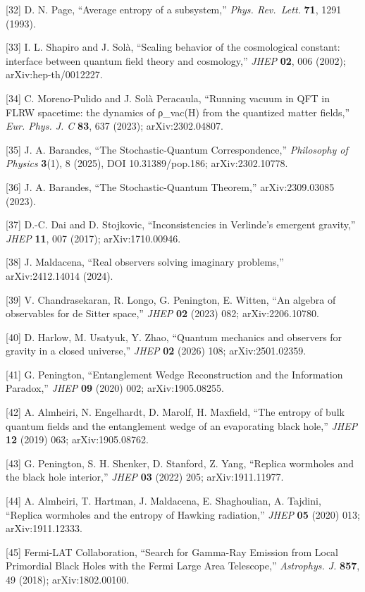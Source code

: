 \documentclass[
]{article}
\begin{document}
{[}32{]} D. N. Page, ``Average entropy of a subsystem,'' \emph{Phys.
Rev.~Lett.} \textbf{71}, 1291 (1993).

{[}33{]} I. L. Shapiro and J. Solà, ``Scaling behavior of the
cosmological constant: interface between quantum field theory and
cosmology,'' \emph{JHEP} \textbf{02}, 006 (2002); arXiv:hep-th/0012227.

{[}34{]} C. Moreno-Pulido and J. Solà Peracaula, ``Running vacuum in QFT
in FLRW spacetime: the dynamics of ρ\_vac(H) from the quantized matter
fields,'' \emph{Eur. Phys. J. C} \textbf{83}, 637 (2023);
arXiv:2302.04807.

{[}35{]} J. A. Barandes, ``The Stochastic-Quantum Correspondence,''
\emph{Philosophy of Physics} \textbf{3}(1), 8 (2025), DOI
10.31389/pop.186; arXiv:2302.10778.

{[}36{]} J. A. Barandes, ``The Stochastic-Quantum Theorem,''
arXiv:2309.03085 (2023).

{[}37{]} D.-C. Dai and D. Stojkovic, ``Inconsistencies in Verlinde's
emergent gravity,'' \emph{JHEP} \textbf{11}, 007 (2017);
arXiv:1710.00946.

{[}38{]} J. Maldacena, ``Real observers solving imaginary problems,''
arXiv:2412.14014 (2024).

{[}39{]} V. Chandrasekaran, R. Longo, G. Penington, E. Witten, ``An
algebra of observables for de Sitter space,'' \emph{JHEP} \textbf{02}
(2023) 082; arXiv:2206.10780.

{[}40{]} D. Harlow, M. Usatyuk, Y. Zhao, ``Quantum mechanics and
observers for gravity in a closed universe,'' \emph{JHEP} \textbf{02}
(2026) 108; arXiv:2501.02359.

{[}41{]} G. Penington, ``Entanglement Wedge Reconstruction and the
Information Paradox,'' \emph{JHEP} \textbf{09} (2020) 002;
arXiv:1905.08255.

{[}42{]} A. Almheiri, N. Engelhardt, D. Marolf, H. Maxfield, ``The
entropy of bulk quantum fields and the entanglement wedge of an
evaporating black hole,'' \emph{JHEP} \textbf{12} (2019) 063;
arXiv:1905.08762.

{[}43{]} G. Penington, S. H. Shenker, D. Stanford, Z. Yang, ``Replica
wormholes and the black hole interior,'' \emph{JHEP} \textbf{03} (2022)
205; arXiv:1911.11977.

{[}44{]} A. Almheiri, T. Hartman, J. Maldacena, E. Shaghoulian, A.
Tajdini, ``Replica wormholes and the entropy of Hawking radiation,''
\emph{JHEP} \textbf{05} (2020) 013; arXiv:1911.12333.

{[}45{]} Fermi-LAT Collaboration, ``Search for Gamma-Ray Emission from
Local Primordial Black Holes with the Fermi Large Area Telescope,''
\emph{Astrophys. J.} \textbf{857}, 49 (2018); arXiv:1802.00100.
\end{document}
